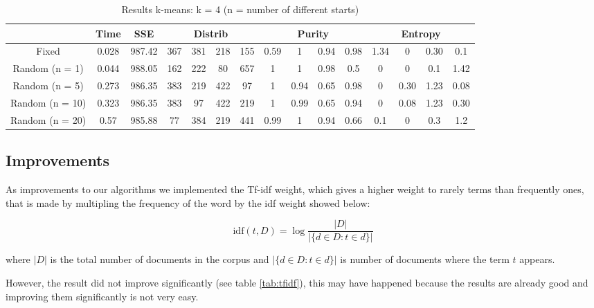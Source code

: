 \documentclass[a4paper,11pt]{article}
\begin{document}
\begin{table}[ht!]
  \caption{Results k-means: k = 4 (n = number of different starts)}
  \begin{centering}
    \begin{tabular}{|c|c|c|c|c|c|c|c|c|c|c|c|c|c|c|}
      \cline{2-15} 
      \multicolumn{1}{c|}{} & Time & SSE & \multicolumn{4}{c|}{Distrib} & \multicolumn{4}{c|}{Purity} & \multicolumn{4}{c|}{Entropy}\tabularnewline
      \hline 
      Fixed & 0.028 & 987.42 & 367 & 381 & 218 & 155 & 0.59 & 1 & 0.94 & 0.98 & 1.34 & 0 & 0.30 & 0.1\tabularnewline
      \hline 
      Random (n = 1) & 0.044 & 988.05 & 162 & 222 & 80 & 657 & 1 & 1 & 0.98 & 0.5 & 0 & 0 & 0.1 & 1.42\tabularnewline
      \hline 
      Random (n = 5) & 0.273 & 986.35 & 383 & 219 & 422 & 97 & 1 & 0.94 & 0.65 & 0.98 & 0 & 0.30 & 1.23 & 0.08\tabularnewline
      \hline 
      Random (n = 10) & 0.323 & 986.35 & 383 & 97 & 422 & 219 & 1 & 0.99 & 0.65 & 0.94 & 0 & 0.08 & 1.23 & 0.30\tabularnewline
      \hline 
      Random (n = 20) & 0.57 & 985.88 & 77 & 384 & 219 & 441 & 0.99 & 1 & 0.94 & 0.66 & 0.1 & 0 & 0.3 & 1.2\tabularnewline
      \hline 
    \end{tabular}
    \par\end{centering}
  
  
\end{table}

\subsection{Improvements}

As improvements to our  algorithms we implemented the Tf-idf weight\cite{WIKI1},
which gives a  higher weight to rarely terms than frequently  ones, that is made
by multipling the frequency of the word by the idf weight showed below:

\begin{equation}
 \mathrm{idf}(t, D) = \log \frac{|D|}{|\{d \in D: t \in d\}|}
\end{equation}

where $ |D|$ is the total number of documents in the corpus and
$ |\{d \in D: t \in d\}|$ is number of documents where the term $t$ appears.


 However, the result did not improve significantly (see table \ref{tab:tfidf}), this may have happened because the results are
already good and improving them significantly is not very easy.
 
\end{document}
